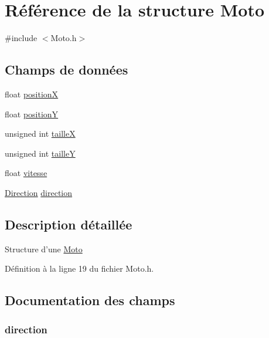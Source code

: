 \hypertarget{struct_moto}{\section{Référence de la structure Moto}
\label{struct_moto}
}


{\ttfamily \#include $<$Moto.\-h$>$}

\subsection*{Champs de données}
\begin{DoxyCompactItemize}
\item 
float \hyperlink{struct_moto_a79a982036e5591bf27af7cc2edcd6f4c}{position\-X}
\item 
float \hyperlink{struct_moto_ad17be35b83017d6dc83074e6b8d21207}{position\-Y}
\item 
unsigned int \hyperlink{struct_moto_a14a7f2008ff990cae95babeb28176bad}{taille\-X}
\item 
unsigned int \hyperlink{struct_moto_ab277c464cec35f230262c48fec89a566}{taille\-Y}
\item 
float \hyperlink{struct_moto_aef55e1775d611bfea0196692da1a0bc5}{vitesse}
\item 
\hyperlink{_moto_8h_a224b9163917ac32fc95a60d8c1eec3aa}{Direction} \hyperlink{struct_moto_a53421c695d00016ab925777d423b4eb6}{direction}
\end{DoxyCompactItemize}


\subsection{Description détaillée}
Structure d'une \hyperlink{struct_moto}{Moto} 

Définition à la ligne 19 du fichier Moto.\-h.



\subsection{Documentation des champs}
\hypertarget{struct_moto_a53421c695d00016ab925777d423b4eb6}{
\subsubsection[{direction}]{ direction}}\label{struct_moto_a53421c695d00016ab925777d423b4eb6}


